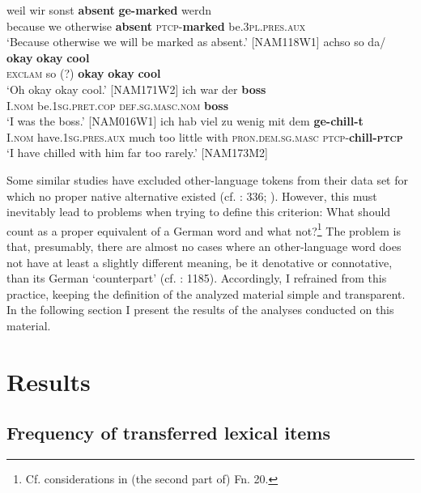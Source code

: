 \documentclass[output=paper]{langsci/langscibook}
\begin{document}
\ea
\label{ex:bracke:4}
\gll weil wir sonst \textbf{absent} \textbf{ge-marked} werdn\\
     because we otherwise \textbf{absent} \textsc{ptcp-}\textbf{marked} be.\textsc{3pl.pres.aux}\\
\glt `Because otherwise we will be marked as absent.' {[}NAM118W1{]}
\ex\label{ex:bracke:5}
	\gll achso so da/ \textbf{okay} \textbf{okay} \textbf{cool}     \\
     \textsc{exclam} so (?) \textbf{okay} \textbf{okay} \textbf{cool}\\
	\glt `Oh okay okay cool.' {[}NAM171W2{]}
\ex
\label{ex:bracke:6}
\gll ich war der \textbf{boss}\\
     I.\textsc{nom} be.\textsc{1sg.pret.cop} \textsc{def.sg.masc.nom} \textbf{boss}\\
\glt `I was the boss.' {[}NAM016W1{]}
\ex
\label{ex:bracke:7}
\gll ich hab viel zu wenig mit dem \textbf{ge-chill-t}  \\
     I.\textsc{nom} have.1\textsc{sg.pres.aux} much too little with \textsc{pron.dem.sg.masc} \textsc{ptcp-}\textbf{chill-\textsc{ptcp}}\\
\glt `I have chilled with him far too rarely.' {[}NAM173M2{]}
\z

Some similar studies have excluded other-language tokens from their data set for which no proper native alternative existed (cf. \citealt{zenner_sociolinguistic_2015}: 336; \citealt{calude_modelling_2017}). However, this must inevitably lead to problems when trying to define this criterion: What should count as a proper equivalent of a German word and what not?\footnote{Cf. considerations in (the second part of) Fn. 20.} The problem is that, presumably, there are almost no cases where an other-language word does not have at least a slightly different meaning, be it denotative or connotative, than its German ‘counterpart’ (cf. \citealt{zimmer_deutsch_2019}: 1185). Accordingly, I refrained from this practice, keeping the definition of the analyzed material simple and transparent. In the following section I present the results of the analyses conducted on this material.

 
\section{Results}\label{sec:bracke:5}
\subsection{Frequency of transferred lexical items}\label{sec:bracke:5.1}
\end{document}
